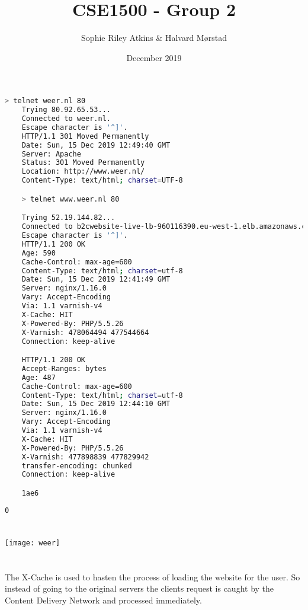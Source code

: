 \documentclass{article}
\title{CSE1500 - Group 2}
\author{Sophie Riley Atkins \& Halvard M{\o}rstad}
\date{December 2019}
\begin{document}
\maketitle

\newpage

	\section{}
	\begin{lstlisting}[language=bash]
	> telnet weer.nl 80
	Trying 80.92.65.53...
	Connected to weer.nl.
	Escape character is '^]'.
	HTTP/1.1 301 Moved Permanently
	Date: Sun, 15 Dec 2019 12:49:40 GMT
	Server: Apache
	Status: 301 Moved Permanently
	Location: http://www.weer.nl/
	Content-Type: text/html; charset=UTF-8

	> telnet www.weer.nl 80

	Trying 52.19.144.82...
	Connected to b2cwebsite-live-lb-960116390.eu-west-1.elb.amazonaws.com.
	Escape character is '^]'.
	HTTP/1.1 200 OK
	Age: 590
	Cache-Control: max-age=600
	Content-Type: text/html; charset=utf-8
	Date: Sun, 15 Dec 2019 12:41:49 GMT
	Server: nginx/1.16.0
	Vary: Accept-Encoding
	Via: 1.1 varnish-v4
	X-Cache: HIT
	X-Powered-By: PHP/5.5.26
	X-Varnish: 478064494 477544664
	Connection: keep-alive

	HTTP/1.1 200 OK
	Accept-Ranges: bytes
	Age: 487
	Cache-Control: max-age=600
	Content-Type: text/html; charset=utf-8
	Date: Sun, 15 Dec 2019 12:44:10 GMT
	Server: nginx/1.16.0
	Vary: Accept-Encoding
	Via: 1.1 varnish-v4
	X-Cache: HIT
	X-Powered-By: PHP/5.5.26
	X-Varnish: 477898839 477829942
	transfer-encoding: chunked
	Connection: keep-alive

	1ae6
	\end{lstlisting}
	
	\begin{lstlisting}[language=bash]
	0
	\end{lstlisting}

\newpage
	\section{}
	\texttt{[image: weer]}

	\section{}
	The X-Cache is used to hasten the process of loading the website for the user. So instead of going to the original servers the clients request is caught by the Content Delivery Network and processed immediately.
\end{document}
